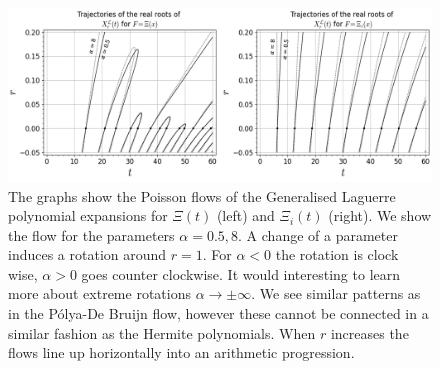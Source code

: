 \documentclass[a4paper,11pt,twoside]{amsart}
\begin{document}
\begin{small}
\pagebreak
\noindent{}
\begin{figure}[H]
  \includegraphics[width=1\linewidth]{LaguerreFlowdouble.jpeg}
  \caption{The graphs show the Poisson flows of the Generalised Laguerre polynomial expansions for $\Xi(t)$ (left) and $\Xi_i(t)$ (right). We show the flow for the parameters $\alpha = 0.5, 8$. A change of a parameter induces a rotation around $r=1$. For $\alpha < 0$ the rotation is clock wise, $\alpha > 0$ goes counter clockwise. It would interesting to learn more about extreme rotations $\alpha \rightarrow \pm \infty$. We see similar patterns as in the Pólya-De Bruijn flow, however these cannot be connected in a similar fashion as the Hermite polynomials. When $r$ increases the flows line up horizontally into an arithmetic progression.}

\end{figure}
\end{small}
\end{document}
